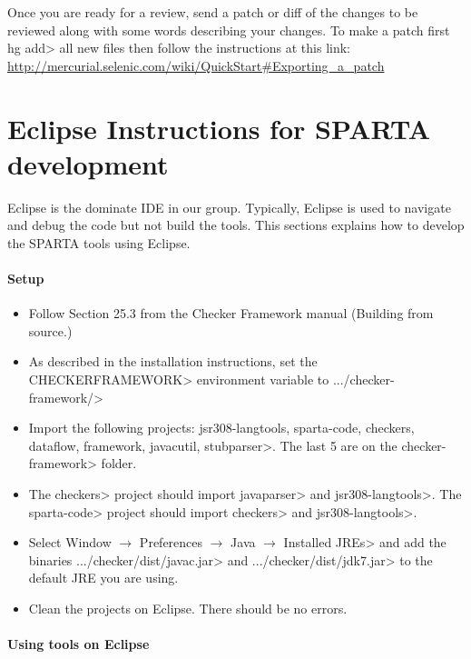 Once you are ready for a review, send a patch or diff of the changes to be reviewed along with some words describing your changes.  To make a patch first \<hg add> all new files then follow the instructions at this link: 
\url{http://mercurial.selenic.com/wiki/QuickStart#Exporting_a_patch}

\section{Eclipse Instructions for SPARTA development\label{eclipse-instructions}}

Eclipse is the dominate IDE in our group.  Typically, Eclipse is used to navigate and debug the code but not build the tools.  This sections explains how to develop the 
SPARTA tools using Eclipse.  

\paragraph{Setup}


\begin{itemize}
\item Follow Section 25.3 from the Checker Framework manual 
(Building from source.)
\item As described in the installation instructions, set the \<CHECKERFRAMEWORK>
environment variable to \<.../checker-framework/>
\item Import the following projects: \<jsr308-langtools,
sparta-code, checkers, dataflow, framework, javacutil, stubparser>. The last 5 are  on the
\<checker-framework> folder.
\item The \<checkers> project should import \<javaparser> and \<jsr308-langtools>. 
The \<sparta-code> project should import \<checkers> and \<jsr308-langtools>.  
\item Select  \<Window $\rightarrow$ Preferences $\rightarrow$ Java 
$\rightarrow$ Installed JREs> and add the binaries \<.../checker/dist/javac.jar> 
and \<.../checker/dist/jdk7.jar> to the default JRE you are using.
\item Clean the projects on Eclipse. There should be no errors. 
\end{itemize}

\paragraph{Using tools on Eclipse}

